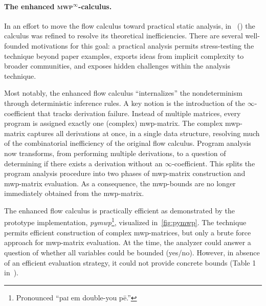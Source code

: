 \paragraph*{The enhanced \textsc{mwp}\(^\infty\)-calculus.}
In an effort to move the flow calculus toward practical static analysis,
in~\cite{aubert20222} () the calculus was refined to resolve its theoretical inefficiencies.
There are several well-founded motivations for this goal:
a practical analysis permits stress-testing the technique beyond paper examples, exports ideas from implicit complexity to broader communities, and exposes hidden challenges within the analysis technique.

Most notably, the enhanced flow calculus \enquote{internalizes}
the nondeterminism through deterministic inference rules.
A key notion is the introduction of the \(\infty\)-coefficient that tracks derivation failure.
Instead of multiple matrices, every program is assigned exactly one (complex) mwp-matrix.
The complex mwp-matrix captures all derivations at once, in a single data structure, resolving much of the combinatorial inefficiency of the original flow calculus.
Program analysis now transforms, from performing multiple derivations, to a question of determining if there exists a derivation without an \(\infty\)-coefficient.
This splits the program analysis procedure into two phases of mwp-matrix construction and mwp-matrix evaluation.
As a consequence, the mwp-bounds are no longer immediately obtained from the mwp-matrix.

The enhanced flow calculus is practically efficient as demonstrated by the prototype implementation, \emph{pymwp}\footnote{
    Pronounced \enquote{pa\textsc{i} em double-you p\={e}.}}, visualized in~\autoref{fig:pymwp}.
The technique permits efficient construction of complex mwp-matrices, but only a brute force approach for mwp-matrix evaluation.
At the time, the analyzer could answer a question of whether all variables could be bounded (yes/no).
However, in absence of an efficient evaluation strategy, it could not provide concrete bounds (\cf Table 1 in~).

